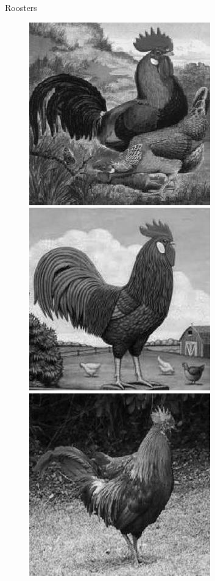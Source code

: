 \documentclass{beamer}
\begin{document}
\begin{frame}{Roosters}
  \begin{figure}
    \centering
    \includegraphics[scale=.4]{roosterrs-image_0001.jpg}
    \includegraphics[scale=.4]{roosterrs-image_0002.jpg} \\
    \includegraphics[scale=.4]{roosterrs-image_0003.jpg} 

\end{figure}
\end{frame}
\end{document}
